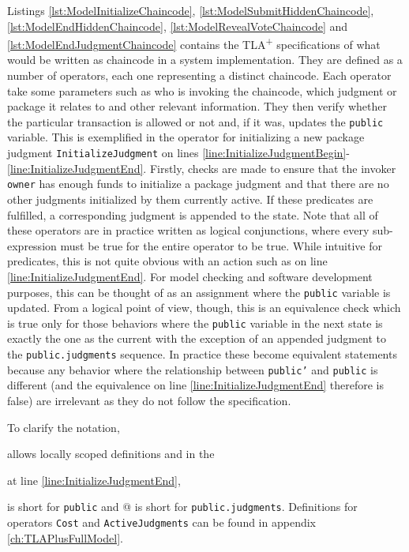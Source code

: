 Listings \ref{lst:ModelInitializeChaincode}, \ref{lst:ModelSubmitHiddenChaincode}, \ref{lst:ModelEndHiddenChaincode}, \ref{lst:ModelRevealVoteChaincode} and \ref{lst:ModelEndJudgmentChaincode} contains the TLA\textsuperscript+ specifications of what would be written as chaincode in a system implementation. They are defined as a number of operators, each one representing a distinct chaincode. Each operator take some parameters such as who is invoking the chaincode, which judgment or package it relates to and other relevant information. They then verify whether the particular transaction is allowed or not and, if it was, updates the \texttt{public} variable. This is exemplified in the operator for initializing a new package judgment \texttt{InitializeJudgment} on lines \ref{line:InitializeJudgmentBegin}-\ref{line:InitializeJudgmentEnd}. Firstly, checks are made to ensure that the invoker \texttt{owner} has enough funds to initialize a package judgment and that there are no other judgments initialized by them currently active. If these predicates are fulfilled, a corresponding judgment is appended to the state. Note that all of these operators are in practice written as logical conjunctions, where every sub-expression must be true for the entire operator to be true. While intuitive for predicates, this is not quite obvious with an action such as on line \ref{line:InitializeJudgmentEnd}. For model checking and software development purposes, this can be thought of as an assignment where the \texttt{public} variable is updated. From a logical point of view, though, this is an equivalence check which is true only for those behaviors where the \texttt{public} variable in the next state is exactly the one as the current with the exception of an appended judgment to the \texttt{public.judgments} sequence. In practice these become equivalent statements because any behavior where the relationship between \texttt{public'} and \texttt{public} is different (and the equivalence on line \ref{line:InitializeJudgmentEnd} therefore is false) are irrelevant as they do not follow the specification.

To clarify the notation, \begin{tlatex}{\LET \IN}\end{tlatex} allows locally scoped definitions and in the \begin{tlatex}{\EXCEPT}\end{tlatex} at line \ref{line:InitializeJudgmentEnd}, \begin{tlatex}{\bang}\end{tlatex} is short for \texttt{public} and @ is short for \texttt{public.judgments}. Definitions for operators \texttt{Cost} and \texttt{ActiveJudgments} can be found in appendix \ref{ch:TLAPlusFullModel}.

